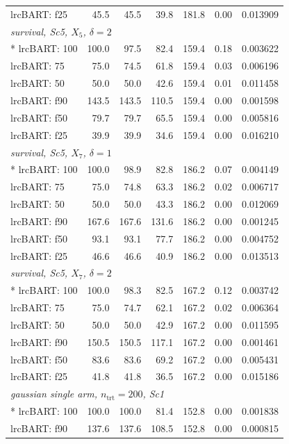 \begin{longtable}{lrrrrrr}
lrcBART: f25 & 45.5 & 45.5 & 39.8 & 181.8 & 0.00 & 0.013909 \\
\multicolumn{7}{l}{\strut\textit{survival, Sc5, $X_5$, $\delta=2$}}\\*
lrcBART: 100 & 100.0 & 97.5 & 82.4 & 159.4 & 0.18 & 0.003622 \\
lrcBART: 75 & 75.0 & 74.5 & 61.8 & 159.4 & 0.03 & 0.006196 \\
lrcBART: 50 & 50.0 & 50.0 & 42.6 & 159.4 & 0.01 & 0.011458 \\
lrcBART: f90 & 143.5 & 143.5 & 110.5 & 159.4 & 0.00 & 0.001598 \\
lrcBART: f50 & 79.7 & 79.7 & 65.5 & 159.4 & 0.00 & 0.005816 \\
lrcBART: f25 & 39.9 & 39.9 & 34.6 & 159.4 & 0.00 & 0.016210 \\
\multicolumn{7}{l}{\strut\textit{survival, Sc5, $X_7$, $\delta=1$}}\\*
lrcBART: 100 & 100.0 & 98.9 & 82.8 & 186.2 & 0.07 & 0.004149 \\
lrcBART: 75 & 75.0 & 74.8 & 63.3 & 186.2 & 0.02 & 0.006717 \\
lrcBART: 50 & 50.0 & 50.0 & 43.3 & 186.2 & 0.00 & 0.012069 \\
lrcBART: f90 & 167.6 & 167.6 & 131.6 & 186.2 & 0.00 & 0.001245 \\
lrcBART: f50 & 93.1 & 93.1 & 77.7 & 186.2 & 0.00 & 0.004752 \\
lrcBART: f25 & 46.6 & 46.6 & 40.9 & 186.2 & 0.00 & 0.013513 \\
\multicolumn{7}{l}{\strut\textit{survival, Sc5, $X_7$, $\delta=2$}}\\*
lrcBART: 100 & 100.0 & 98.3 & 82.5 & 167.2 & 0.12 & 0.003742 \\
lrcBART: 75 & 75.0 & 74.7 & 62.1 & 167.2 & 0.02 & 0.006364 \\
lrcBART: 50 & 50.0 & 50.0 & 42.9 & 167.2 & 0.00 & 0.011595 \\
lrcBART: f90 & 150.5 & 150.5 & 117.1 & 167.2 & 0.00 & 0.001461 \\
lrcBART: f50 & 83.6 & 83.6 & 69.2 & 167.2 & 0.00 & 0.005431 \\
lrcBART: f25 & 41.8 & 41.8 & 36.5 & 167.2 & 0.00 & 0.015186 \\
\multicolumn{7}{l}{\strut\textit{gaussian single arm, $n_{\mathrm{trt}}=200$, Sc1}}\\*
lrcBART: 100 & 100.0 & 100.0 & 81.4 & 152.8 & 0.00 & 0.001838 \\
lrcBART: f90 & 137.6 & 137.6 & 108.5 & 152.8 & 0.00 & 0.000815 \\

\end{longtable}
